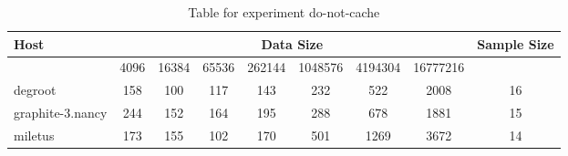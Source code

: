 \begin{table}
\caption{Table for experiment do-not-cache}
\begin{tabular}{@{}lcccccccc@{}}
\toprule
Host    & \multicolumn{7}{c}{Data Size}          & Sample Size \\ \midrule
& 4096  & 16384  & 65536  & 262144  & 1048576  & 4194304  & 16777216              \\ \midrule
degroot  & 158  & 100  & 117  & 143  & 232  & 522  & 2008  & 16 \\
graphite-3.nancy  & 244  & 152  & 164  & 195  & 288  & 678  & 1881  & 15 \\
miletus  & 173  & 155  & 102  & 170  & 501  & 1269  & 3672  & 14 \\
\bottomrule
\end{tabular}
\end{table}